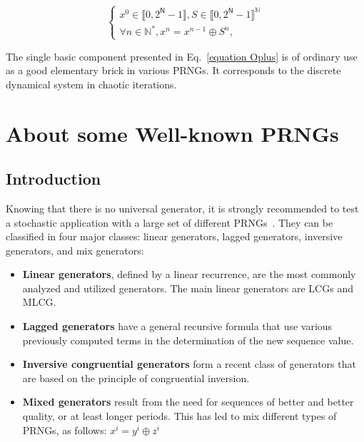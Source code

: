 \documentclass[10pt, conference, compsocconf]{IEEEtran}
\begin{document}
\begin{equation}
\left\{
\begin{array}{l}
x^0 \in \llbracket 0, 2^\mathsf{N}-1 \rrbracket, S \in \llbracket 0, 2^\mathsf{N}-1 \rrbracket^\mathds{N} \\
\forall n \in \mathds{N}^*, x^n = x^{n-1} \oplus S^n,
\end{array}
\right.
\label{equation Oplus}
\end{equation}

The single basic component presented in Eq.~\ref{equation Oplus} is of
ordinary use as a good elementary brick in various PRNGs. It corresponds
to the discrete dynamical system in chaotic iterations.

\section{About some Well-known PRNGs}
\label{The generation of pseudo-random sequence}

\subsection{Introduction}

Knowing that there is no universal generator, it is strongly recommended to test a stochastic application with a large set of different PRNGs~\cite{DavidRC2003643}. They can be classified in four major classes: linear generators, lagged generators, inversive generators, and mix generators:
\begin{itemize}
 \item \textbf{Linear generators}, defined by a linear recurrence, are the most commonly analyzed and utilized generators. The main linear generators are LCGs and MLCG.
 \item \textbf{Lagged generators} have a general recursive formula that use various previously computed terms in the determination of the new sequence value.
 \item \textbf{Inversive congruential generators} form a recent class of generators that are based on the principle of congruential inversion.
 \item \textbf{Mixed generators} result from the need for sequences of better and better quality, or at least longer periods. This has led to mix different types of PRNGs, as follows: $x^i=y^i\oplus z^i$
\end{itemize}
\end{document}
